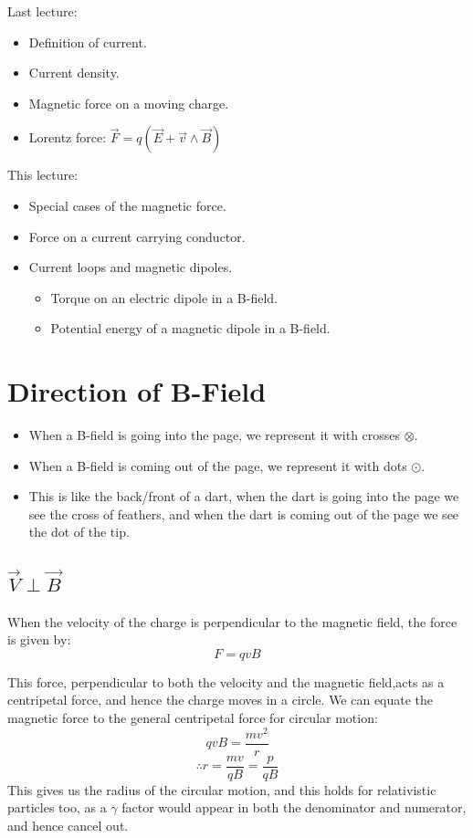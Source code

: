 
Last lecture:
\begin{itemize}
    \item Definition of current.
    \item Current density.
    \item Magnetic force on a moving charge.
    \item Lorentz force: $\vec{F} = q \left(\vec{E} + \vec{v} \wedge \vec{B}\right)$
\end{itemize}

This lecture:
\begin{itemize}
    \item Special cases of the magnetic force.
    \item Force on a current carrying conductor.
    \item Current loops and magnetic dipoles.
    \begin{itemize}
        \item Torque on an electric dipole in a B-field.
        \item Potential energy of a magnetic dipole in a B-field.
    \end{itemize}
\end{itemize}

\section{Direction of B-Field}
\begin{itemize}
    \item When a B-field is going into the page, we represent it with crosses $\otimes$.
    \item When a B-field is coming out of the page, we represent it with dots $\odot$.
    \item This is like the back/front of a dart, when the dart is going into the page we see the cross of feathers, and when the dart is coming out of the page we see the dot of the tip.
\end{itemize}

\subsection{$\vec{V} \perp \vec{B}$}
When the velocity of the charge is perpendicular to the magnetic field, the force is given by:
\[
    F = qvB
\]

This force, perpendicular to both the velocity and the magnetic field,acts as a centripetal force, and hence the charge moves in a circle. We can equate the magnetic force to the general centripetal force for circular motion:
\[
    qvB = \frac{mv^2}{r}
\]
\[
    \therefore r = \frac{mv}{qB} = \frac{p}{qB}
\]
This gives us the radius of the circular motion, and this holds for relativistic particles too, as a $\gamma$ factor would appear in both the denominator and numerator, and hence cancel out.

